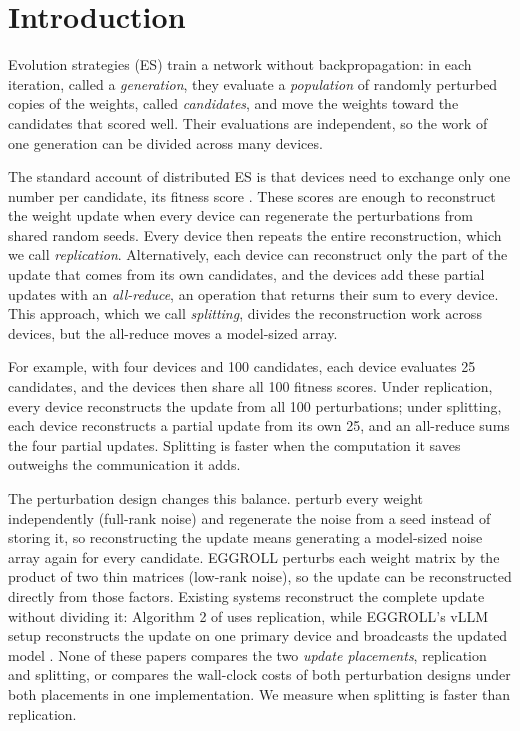 \section{Introduction}

Evolution strategies (ES) train a network without backpropagation: in each iteration,
called a \emph{generation}, they evaluate a \emph{population} of randomly perturbed
copies of the weights, called \emph{candidates}, and move the weights toward the
candidates that scored well. Their evaluations are independent, so the work of one
generation can be divided across many devices.

The standard account of distributed ES is that devices need to exchange only one number
per candidate, its fitness score \citep{salimans2017}. These scores are enough to
reconstruct the weight update when every device can regenerate the perturbations from
shared random seeds. Every device then repeats the entire reconstruction, which we call
\emph{replication}. Alternatively, each device can reconstruct only the part of the
update that comes from its own candidates, and the devices add these partial updates
with an \emph{all-reduce}, an operation that returns their sum to every device. This
approach, which we call \emph{splitting}, divides the reconstruction work across
devices, but the all-reduce moves a model-sized array.

For example, with four devices and 100 candidates, each device evaluates 25 candidates,
and the devices then share all 100 fitness scores. Under replication, every device
reconstructs the update from all 100 perturbations; under splitting, each device
reconstructs a partial update from its own 25, and an all-reduce sums the four partial
updates. Splitting is faster when the computation it saves outweighs the communication
it adds.

The perturbation design changes this balance. \citet{qiu2025} perturb every weight
independently (full-rank noise) and regenerate the noise from a seed instead of storing
it, so reconstructing the update means generating a model-sized noise array again for
every candidate. EGGROLL \citep{eggroll2025} perturbs each weight matrix by the product
of two thin matrices (low-rank noise), so the update can be reconstructed directly
from those factors. Existing systems reconstruct the complete update without dividing it:
Algorithm 2 of \citet{salimans2017} uses replication, while EGGROLL's vLLM setup
reconstructs the update on one primary device and broadcasts the updated model
\citep[Appendix L.2]{eggroll2025}. None of these papers compares the two \emph{update
placements}, replication and splitting, or compares the wall-clock costs of both
perturbation designs under both placements in one implementation. We measure when
splitting is faster than replication.

